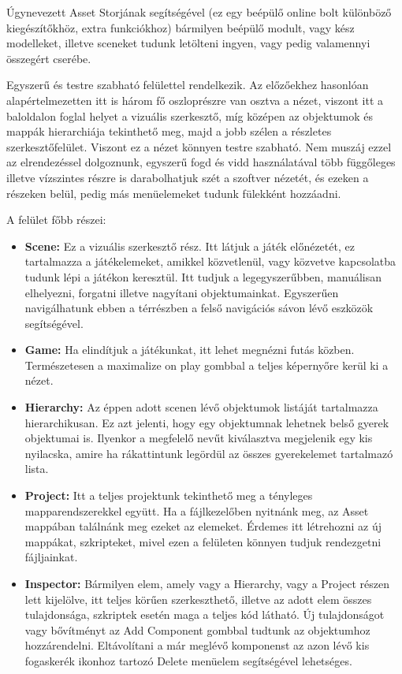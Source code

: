\documentclass[colorlinks]{thesis-ekf}
\theoremstyle{definition}
\theoremstyle{remark}
\begin{document}
Úgynevezett Asset Storjának segítségével (ez egy beépülő online bolt különböző kiegészítőkhöz, extra funkciókhoz) bármilyen beépülő modult, vagy kész modelleket, illetve sceneket tudunk letölteni ingyen, vagy pedig valamennyi összegért cserébe.

Egyszerű és testre szabható felülettel rendelkezik. Az előzőekhez hasonlóan alapértelmezetten itt is három fő oszloprészre van osztva a nézet, viszont itt a baloldalon foglal helyet a vizuális szerkesztő, míg középen az objektumok és mappák hierarchiája tekinthető meg, majd a jobb szélen a részletes szerkesztőfelület. Viszont ez a nézet könnyen testre szabható. Nem muszáj ezzel az elrendezéssel dolgoznunk, egyszerű fogd és vidd használatával több függőleges illetve vízszintes részre is darabolhatjuk szét a szoftver nézetét, és ezeken a részeken belül, pedig más menüelemeket tudunk fülekként hozzáadni.

A felület főbb részei:
\begin{itemize}
	\item \textbf{Scene:} Ez a vizuális szerkesztő rész. Itt látjuk a játék előnézetét, ez tartalmazza a játékelemeket, amikkel közvetlenül, vagy közvetve kapcsolatba tudunk lépi a játékon keresztül. Itt tudjuk a legegyszerűbben, manuálisan elhelyezni, forgatni illetve nagyítani objektumainkat. Egyszerűen navigálhatunk ebben a térrészben a felső navigációs sávon lévő eszközök segítségével.
	\item \textbf{Game:} Ha elindítjuk a játékunkat, itt lehet megnézni futás közben. Természetesen a maximalize on play gombbal a teljes képernyőre kerül ki a nézet.
	\item \textbf{Hierarchy:} Az éppen adott scenen lévő objektumok listáját tartalmazza hierarchikusan. Ez azt jelenti, hogy egy objektumnak lehetnek belső gyerek objektumai is. Ilyenkor a megfelelő nevűt kiválasztva megjelenik egy kis nyilacska, amire ha rákattintunk legördül az összes gyerekelemet tartalmazó lista.
	\item \textbf{Project:} Itt a teljes projektunk tekinthető meg a tényleges mapparendszerekkel együtt. Ha a fájlkezelőben nyitnánk meg, az Asset mappában találnánk meg ezeket az elemeket. Érdemes itt létrehozni az új mappákat, szkripteket, mivel ezen a felületen könnyen tudjuk rendezgetni fájljainkat.
	\item \textbf{Inspector:} Bármilyen elem, amely vagy a Hierarchy, vagy a Project részen lett kijelölve, itt teljes körűen szerkeszthető, illetve az adott elem összes tulajdonsága, szkriptek esetén maga a teljes kód látható. Új tulajdonságot vagy bővítményt az Add Component gombbal tudtunk az objektumhoz hozzárendelni. Eltávolítani a már meglévő komponenst az azon lévő kis fogaskerék ikonhoz tartozó Delete menüelem segítségével lehetséges.
\end{itemize}
\end{document}
